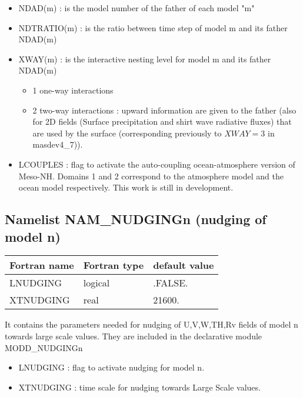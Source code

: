 \begin{itemize}
\item
{}  
NDAD(m) : is the model number of the father of each model "m"
\item
{}
NDTRATIO(m) : is the ratio between time step of model m and its father NDAD(m)
\item
{} 
XWAY(m) : is the interactive nesting level for model m and its father NDAD(m)
\begin{itemize}
\item 1 one-way interactions
\item 2 two-way interactions : upward information are given to the father (also for 2D fields (Surface precipitation and
shirt wave radiative fluxes) that are used by the surface (corresponding previously to $XWAY=3$ in masdev4\_7)). 
\end{itemize}
\item
{} 
LCOUPLES : flag to activate the auto-coupling ocean-atmosphere version of Meso-NH. Domains 1 and 2 correspond to the atmosphere model and the ocean model respectively. This work is still in development.

\end{itemize}
\subsection{Namelist NAM\_NUDGINGn (nudging of model n)}

\begin{center}
\begin{tabular} {|l|l|l|}
\hline
Fortran name & Fortran type & default value \\
\hline
LNUDGING   &  logical & .FALSE. \\
XTNUDGING  &  real    &  21600. \\
\hline
\end{tabular}
\end{center}

It contains the parameters needed for nudging of U,V,W,TH,Rv fields of model n
towards large scale values. They are
included in the declarative module MODD\_NUDGINGn
\begin{itemize}
\item
{}
LNUDGING : flag to activate nudging for model n.
\item
{}
XTNUDGING : time scale for nudging towards Large Scale values.
\end{itemize}


